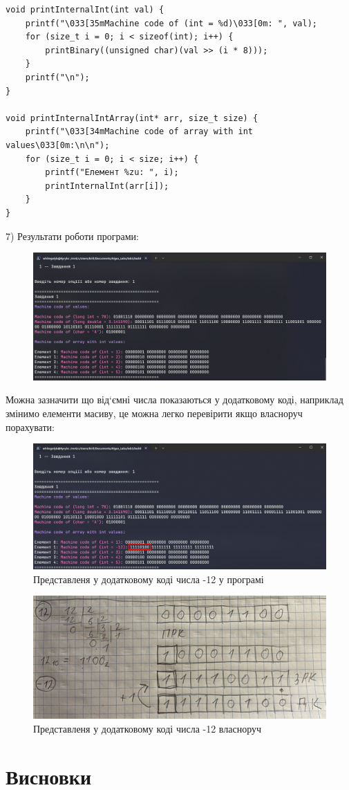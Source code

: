 \begin{lstlisting}[style=customc]
void printInternalInt(int val) {
    printf("\033[35mMachine code of (int = %d)\033[0m: ", val);
    for (size_t i = 0; i < sizeof(int); i++) {
        printBinary((unsigned char)(val >> (i * 8)));
    }
    printf("\n");
}

void printInternalIntArray(int* arr, size_t size) {
    printf("\033[34mMachine code of array with int values\033[0m:\n\n");
    for (size_t i = 0; i < size; i++) {
        printf("Елемент %zu: ", i);
        printInternalInt(arr[i]);
    }
}
\end{lstlisting}

7) Результати роботи програми:
\begin{figure}[h!]
    \centering
    \includegraphics[width=16cm]{reports/algos/lab3/assets/2.png}
\end{figure}

\clearpage
Можна зазначити що від`ємні числа показаються у додатковому коді, наприклад змінимо елементи масиву, це можна легко перевірити якщо власноруч порахувати:
\begin{figure}[h!]
    \centering
    \includegraphics[width=16cm]{reports/algos/lab3/assets/3.png}
    \caption{Представленя у додатковому коді числа -12 у програмі}
\end{figure}

\begin{figure}[h!]
    \centering
    \includegraphics[width=16cm]{reports/algos/lab3/assets/4.jpg}
    \caption{Представленя у додатковому коді числа -12 власноруч}
\end{figure}

\clearpage
\section{Висновки}

